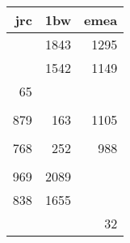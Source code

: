 \documentclass{beamer}
\begin{document}
\begin{frame}
{\begin{columns}[T,totalwidth=\textwidth]
\begin{column}{0.425\textwidth}
\begin{tabular}{rrrrr}
                \end{tabular}
        \end{column}
        \begin{column}{0.425\textwidth}
                \begin{tabular}{rrr}
                    jrc & 1bw  & emea \\ \hline
                    \cellcolor{green!25}{13}  & 1843 & 1295 \\
                    \cellcolor{green!25}{13}  & 1542 & 1149 \\
                    65  & \cellcolor{green!25}{1195} & \cellcolor{green!25}{939}  \\
         && \\
                    879 & 163  & 1105 \\
                    \cellcolor{green!25}{751} & \cellcolor{green!25}{162}  & \cellcolor{green!25}{921}  \\
                    768 & 252  & 988  \\ 
         && \\
                    969 & 2089 & \cellcolor{green!25}{4}    \\   
                    838 & 1655 & \cellcolor{green!25}{4}    \\
                    \cellcolor{green!25}{581} & \cellcolor{green!25}{1155} & 32
                \end{tabular}
        \end{column}
    \end{columns}
    }

\end{frame}
\end{document}
